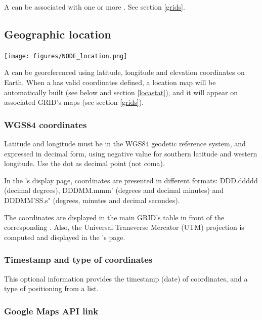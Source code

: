 A  can be associated with one or more . See section \ref{grids}.

\subsection{Geographic location}

\texttt{[image: figures/NODE\_location.png]}

A  can be georeferenced using latitude, longitude and elevation coordinates on Earth. When a  has valid coordinates defined, a location map will be automatically built (see below and section \ref{locastat}), and it will appear on associated GRID's maps (see section \ref{grids}).

\subsubsection{WGS84 coordinates}

Latitude and longitude must be in the WGS84 geodetic reference system, and expressed in decimal form, using negative value for southern latitude and western longitude. Use the dot as decimal point (not coma).

In the 's display page, coordinates are presented in different formats: DDD.ddddd (decimal degrees), DDD\degree MM.mmm' (degrees and decimal minutes) and DDD\degree MM'SS.s" (degrees, minutes and decimal secondes).

The coordinates are displayed in the main GRID's table in front of the corresponding . Also, the Universal Transverse Mercator (UTM) projection is computed and displayed in the 's page.

\subsubsection{Timestamp and type of coordinates}

This optional information provides the timestamp (date) of coordinates, and a type of positioning from a list.




\subsubsection{Google Maps API link}

